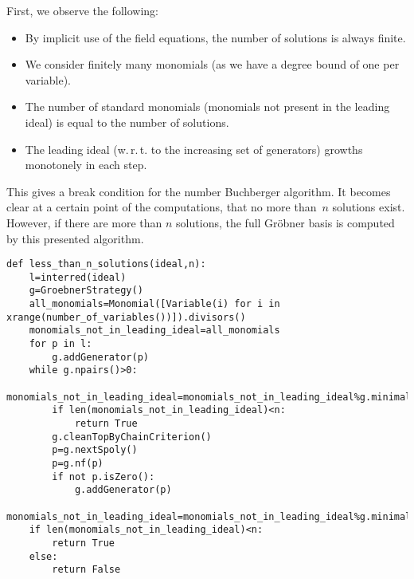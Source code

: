 \documentclass[]{article}
\newcommand{\Groebner}{Gr\"{o}bner\xspace}
\newcounter{thm}
\begin{document}
First, we observe the following:
\begin{itemize}
    \item By implicit use of the field equations, the number of solutions is always finite.
    \item We consider finitely many monomials (as we have a degree bound of one per variable).
    \item The number of standard monomials (monomials not present in the leading ideal) is equal to the number of solutions.
    \item The leading ideal (w.\,r.\,t. to the increasing set of generators) growths monotonely in each step.
\end{itemize}
This gives a break condition for the number Buchberger algorithm. It becomes
clear at a certain point of the computations,  that no more than~$n$ solutions exist.
However, if there are more than $n$ solutions, the full \Groebner basis is computed by this presented algorithm.
\begin{verbatim}
def less_than_n_solutions(ideal,n):
    l=interred(ideal)
    g=GroebnerStrategy()
    all_monomials=Monomial([Variable(i) for i in xrange(number_of_variables())]).divisors()
    monomials_not_in_leading_ideal=all_monomials
    for p in l:
        g.addGenerator(p)
    while g.npairs()>0:
        monomials_not_in_leading_ideal=monomials_not_in_leading_ideal%g.minimalLeadingTerms
        if len(monomials_not_in_leading_ideal)<n:
            return True
        g.cleanTopByChainCriterion()
        p=g.nextSpoly()
        p=g.nf(p)
        if not p.isZero():
            g.addGenerator(p)
    monomials_not_in_leading_ideal=monomials_not_in_leading_ideal%g.minimalLeadingTerms
    if len(monomials_not_in_leading_ideal)<n:
        return True
    else:
        return False    
\end{verbatim}


%

\end{document}

